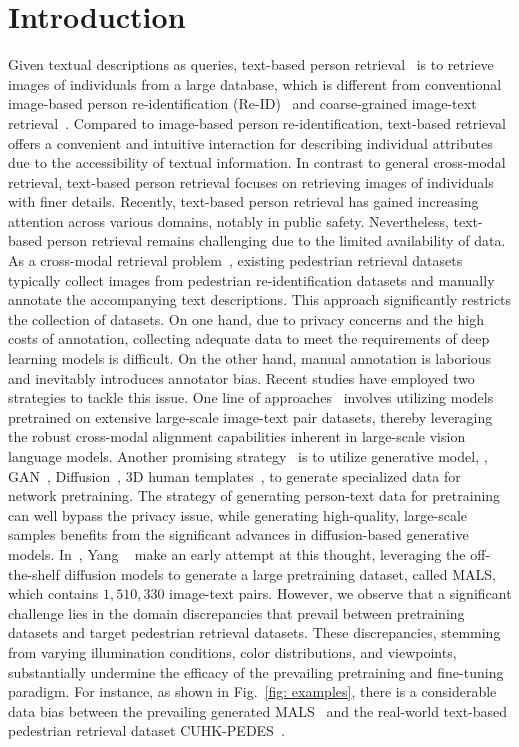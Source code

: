 \section{Introduction}
Given textual descriptions as queries, text-based person retrieval~\cite{li2017person} is to retrieve images of individuals from a large database, which is different from conventional image-based person re-identification (Re-ID)~\cite{book} and coarse-grained image-text retrieval~\cite{lei2022loopitr}.
Compared to image-based person re-identification, text-based retrieval offers a convenient and intuitive interaction for describing individual attributes due to the accessibility of textual information. 
In contrast to general cross-modal retrieval, text-based person retrieval focuses on retrieving images of individuals with finer details. 
Recently, text-based person retrieval has gained increasing attention across various domains, notably in public safety. 
Nevertheless, text-based person retrieval remains challenging due to the limited availability of data. 
As a cross-modal retrieval problem~\cite{KE2024110481, LIU2023109636}, existing pedestrian retrieval datasets typically collect images from pedestrian re-identification datasets and manually annotate the accompanying text descriptions. 
This approach significantly restricts the collection of datasets. 
On one hand, due to privacy concerns and the high costs of annotation, collecting adequate data to meet the requirements of deep learning models is difficult. 
On the other hand, manual annotation is laborious and inevitably introduces annotator bias. 
Recent studies have employed two strategies to tackle this issue. 
One line of approaches~\cite{shu2022see, jiang2023cross, bai2023rasa} involves utilizing models pretrained on extensive large-scale image-text pair datasets, thereby leveraging the robust cross-modal alignment capabilities inherent in large-scale vision language models. 
Another promising strategy~\cite{yang2023towards, zheng2017unlabeled} is to utilize generative model, \eg, GAN~\cite{creswell2018generative}, Diffusion~\cite{rombach2021highresolution, sd15}, 3D human templates~\cite{zheng2022parameter}, to generate specialized data for network pretraining. 
The strategy of generating person-text data for pretraining can well bypass the privacy issue, while generating high-quality, large-scale samples benefits from the significant advances in diffusion-based generative models.
In~\cite{yang2023towards}, Yang \etal~ make an early attempt at this thought, leveraging the off-the-shelf diffusion models to generate a large pretraining dataset, called MALS, which contains $1,510,330$ image-text pairs.
However, we observe that a significant challenge lies in the domain discrepancies that prevail between pretraining datasets and target pedestrian retrieval datasets. 
These discrepancies, stemming from varying illumination conditions, color distributions, and viewpoints, substantially undermine the efficacy of the prevailing pretraining and fine-tuning paradigm. 
For instance, as shown in Fig.~\ref{fig: examples}, there is a considerable data bias between the prevailing generated MALS~\cite{yang2023towards} and the real-world text-based pedestrian retrieval dataset CUHK-PEDES~\cite{li2017person}.


